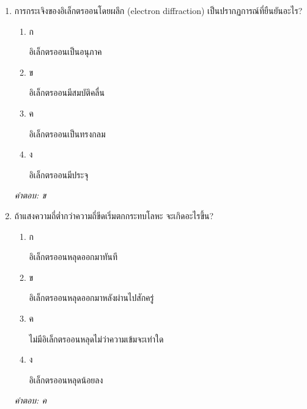 \documentclass[12pt]{article}
\begin{document}
\begin{enumerate}[label=\arabic*., itemsep=0.5\baselineskip, topsep=0.5\baselineskip, leftmargin=*]
\item การกระเจิงของอิเล็กตรออนโดยผลึก (electron diffraction) เป็นปรากฏการณ์ที่ยืนยันอะไร?
\begin{enumerate}[label=\alph*)., itemsep=0.3\baselineskip, topsep=0.3\baselineskip]
\item ก\ 
\begin{minipage}[t]{0.9\linewidth}
\raggedright อิเล็กตรออนเป็นอนุภาค
\end{minipage}
\item ข\ 
\begin{minipage}[t]{0.9\linewidth}
\raggedright อิเล็กตรออนมีสมบัติคลื่น
\end{minipage}
\item ค\ 
\begin{minipage}[t]{0.9\linewidth}
\raggedright อิเล็กตรออนเป็นทรงกลม
\end{minipage}
\item ง\ 
\begin{minipage}[t]{0.9\linewidth}
\raggedright อิเล็กตรออนมีประจุ
\end{minipage}
\end{enumerate}
\vspace{-0.3\baselineskip}
\begin{small}
\textit{คำตอบ: ข}
\end{small}

\item ถ้าแสงความถี่ต่ำกว่าความถี่ขีดเริ่มตกกระทบโลหะ จะเกิดอะไรขึ้น?
\begin{enumerate}[label=\alph*)., itemsep=0.3\baselineskip, topsep=0.3\baselineskip]
\item ก\ 
\begin{minipage}[t]{0.9\linewidth}
\raggedright อิเล็กตรออนหลุดออกมาทันที
\end{minipage}
\item ข\ 
\begin{minipage}[t]{0.9\linewidth}
\raggedright อิเล็กตรออนหลุดออกมาหลังผ่านไปสักครู่
\end{minipage}
\item ค\ 
\begin{minipage}[t]{0.9\linewidth}
\raggedright ไม่มีอิเล็กตรออนหลุดไม่ว่าความเข้มจะเท่าใด
\end{minipage}
\item ง\ 
\begin{minipage}[t]{0.9\linewidth}
\raggedright อิเล็กตรออนหลุดน้อยลง
\end{minipage}
\end{enumerate}
\vspace{-0.3\baselineskip}
\begin{small}
\textit{คำตอบ: ค}
\end{small}


\end{enumerate}
\end{document}
